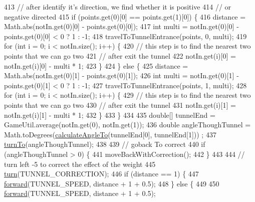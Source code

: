 \begin{DoxyCode}
413     \textcolor{comment}{// after identify it's direction, we find whether it is positive}
414     \textcolor{comment}{// or negative directed}
415     \textcolor{keywordflow}{if} (points.get(0)[0] == points.get(1)[0]) \{
416       distance = Math.abs(notIn.get(0)[0] - points.get(0)[0]);
417       \textcolor{keywordtype}{int} multi = notIn.get(0)[0] - points.get(0)[0] < 0 ? 1 : -1;
418       travelToTunnelEntrance(points, 0, multi);
419       \textcolor{keywordflow}{for} (\textcolor{keywordtype}{int} i = 0; i < notIn.size(); i++) \{
420         \textcolor{comment}{// this step is to find the nearest two points that we can go two}
421         \textcolor{comment}{// after exit the tunnel}
422         notIn.get(i)[0] = notIn.get(i)[0] - multi * 1;
423       \}
424     \} \textcolor{keywordflow}{else} \{
425       distance = Math.abs(notIn.get(0)[1] - points.get(0)[1]);
426       \textcolor{keywordtype}{int} multi = notIn.get(0)[1] - points.get(0)[1] < 0 ? 1 : -1;
427       travelToTunnelEntrance(points, 1, multi);
428       \textcolor{keywordflow}{for} (\textcolor{keywordtype}{int} i = 0; i < notIn.size(); i++) \{
429         \textcolor{comment}{// this step is to find the nearest two points that we can go two}
430         \textcolor{comment}{// after exit the tunnel}
431         notIn.get(i)[1] = notIn.get(i)[1] - multi * 1;
432       \}
433     \}
434 
435     \textcolor{keywordtype}{double}[] tunnelEnd = GameUtil.average(notIn.get(0), notIn.get(1));
436     \textcolor{keywordtype}{double} angleThoughTunnel = Math.toDegrees(\hyperlink{classca_1_1mcgill_1_1ecse211_1_1project_1_1_navigation_a4376e54162df8f123ca3b52e4fd2f38d}{calculateAngleTo}(tunnelEnd[0], tunnelEnd[1]))
      ;
437     \hyperlink{classca_1_1mcgill_1_1ecse211_1_1project_1_1_navigation_a3bbe0645f2b3b3d0986b4a707fb5a00c}{turnTo}(angleThoughTunnel);
438 
439     \textcolor{comment}{// goback To correct}
440     \textcolor{keywordflow}{if} (angleThoughTunnel > 0) \{
441       moveBackWithCorrection();
442     \}
443 
444     \textcolor{comment}{// turn left -5 to correct the effect of the weight}
445     \hyperlink{classca_1_1mcgill_1_1ecse211_1_1project_1_1_navigation_ad74286ad36d333bfaf57661837457b76}{turn}(TUNNEL\_CORRECTION);
446     \textcolor{keywordflow}{if} (distance == 1) \{
447       \hyperlink{classca_1_1mcgill_1_1ecse211_1_1project_1_1_navigation_a7c66610c5b7496ddb35d342ab2cd3f08}{forward}(TUNNEL\_SPEED, distance + 1 + 0.5);
448     \} \textcolor{keywordflow}{else} \{
449 
450       \hyperlink{classca_1_1mcgill_1_1ecse211_1_1project_1_1_navigation_a7c66610c5b7496ddb35d342ab2cd3f08}{forward}(TUNNEL\_SPEED, distance + 1 + 0.5);

\end{DoxyCode}
